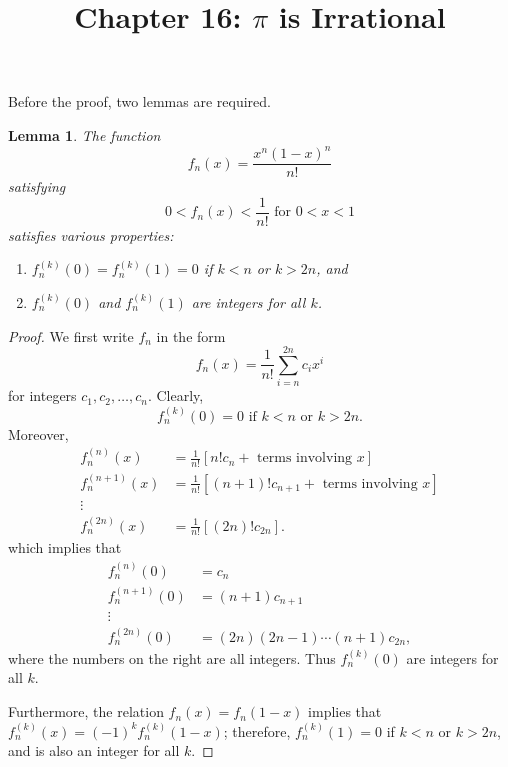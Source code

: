 \documentclass{article}
\newtheorem*{lemma*}{Lemma}
\begin{document}
\title{Chapter 16: $\pi$ is Irrational}
\maketitle

Before the proof, two lemmas are required.

\begin{lemma*}
  The function \begin{equation*}
    f_n(x) = \frac{x^n(1 - x)^n}{n!}
  \end{equation*} satisfying \begin{equation*}
    0 < f_n(x) < \frac{1}{n!} \text{ for } 0 < x < 1
  \end{equation*} satisfies various properties: \begin{enumerate}
    \item $f_n^{(k)}(0) = f_n^{(k)}(1) = 0$ if $k < n$ or $k > 2n$, and
    \item $f_n^{(k)}(0)$ and $f_n^{(k)}(1)$ are integers for all $k$.
  \end{enumerate}
\end{lemma*}

\begin{proof}
  We first write $f_n$ in the form \begin{equation*}
    f_n(x) = \frac{1}{n!}\sum_{i = n}^{2n} c_ix^i
  \end{equation*} for integers $c_1, c_2, \ldots, c_n$. Clearly,
  \begin{equation*}
    f_n^{(k)}(0) = 0 \text{ if } k < n \text{ or } k > 2n.
  \end{equation*} Moreover, \begin{align*}
    f_n^{(n)}(x) &= \frac{1}{n!}[n!c_n + \text{ terms involving } x] \\
    f_n^{(n + 1)}(x) &= \frac{1}{n!}[(n + 1)!c_{n + 1} +
    \text{ terms involving } x] \\
    \vdots& \\
    f_n^{(2n)}(x) &= \frac{1}{n!}[(2n)!c_{2n}].
  \end{align*} which implies that \begin{align*}
    f_n^{(n)}(0) &= c_n \\
    f_n^{(n + 1)}(0) &= (n + 1)c_{n + 1} \\
    \vdots& \\
    f_n^{(2n)}(0) &= (2n)(2n - 1)\cdots(n + 1)c_{2n},
  \end{align*} where the numbers on the right are all integers. Thus
  $f_n^{(k)}(0)$ are integers for all $k$.

  Furthermore, the relation $f_n(x) = f_n(1 - x)$ implies that $f_n^{(k)}(x) =
  (-1)^kf_n^{(k)}(1 - x)$; therefore, $f_n^{(k)}(1) = 0$ if $k < n$ or $k >
  2n$, and is also an integer for all $k$.
\end{proof}
\end{document}
